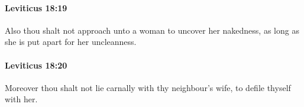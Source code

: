 		\paragraph{Leviticus 18:19} %
			\label{LEVITICUS-18-19}

			Also thou shalt not approach unto a woman to uncover her nakedness, as long as she is put apart for her uncleanness.


		\paragraph{Leviticus 18:20} %
			\label{LEVITICUS-18-20}

			Moreover thou shalt not lie carnally with thy neighbour’s wife, to defile thyself with her.


